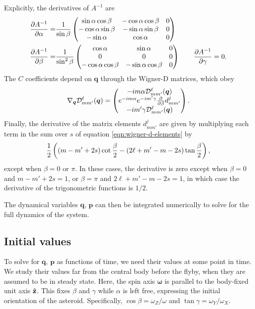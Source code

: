 \documentclass[11pt]{article}
\begin{document}
Explicitly, the derivatives of $A^{-1}$ are
\begin{equation}
\begin{aligned}
\frac{\partial A^{-1}}{\partial \alpha} = & \frac{1}{\sin \beta}\left( \begin{matrix}
\sin \alpha \cos \beta & -\cos \alpha \cos \beta & 0\\
-\cos \alpha \sin \beta & -\sin \alpha \sin \beta & 0 \\
-\sin \alpha & \cos \alpha & 0\\
\end{matrix} \right)\\
\frac{\partial A^{-1}}{\partial \beta} = & \frac{1}{\sin^2\beta}\left( \begin{matrix}
\cos \alpha & \sin \alpha & 0\\
0 & 0 & 0\\
-\cos\alpha \cos\beta & -\sin \alpha \cos \beta & 0\\
\end{matrix} \right)\qquad
\frac{\partial A^{-1}}{\partial \gamma} = 0.
\end{aligned}
\end{equation}
The $C$ coefficients depend on $\bm q$ through the Wigner-D matrices, which obey
\begin{equation}
\nabla_{\bm q}\mathcal{D}^\ell_{m m'}(\bm q) = \left( \begin{matrix}
-im\alpha \mathcal{D}^\ell_{m m'}(\bm q)\\
e^{-im\alpha} e^{-im'\gamma}\frac{\partial}{\partial \beta} d^j_{mm'}\\
-im'\gamma \mathcal{D}^\ell_{m m'}(\bm q)\\
\end{matrix} \right).
\label{eqn:wigner-d-derivatives}
\end{equation}
Finally, the derivative of the matrix elements $d^j_{mm'}$ are given by multiplying each term in the sum over $s$ of equation \ref{eqn:wigner-d-elements} by
$$\frac{1}{2}\left( (m-m'+2s) \cot \frac{\beta}{2} - (2\ell + m' - m - 2s) \tan \frac{\beta}{2} \right),$$
except when $\beta = 0$ or $\pi$. In these cases, the derivative is zero except when $\beta=0$ and $m-m'+2s=1$, or $\beta = \pi$ and $2 \ell + m' - m - 2s=1$, in which case the derivative of the trigonometric functions is $1/2$.


The dynamical variables $\bm q$, $\bm p$ can then be integrated numerically to solve for the full dynamics of the system.

\subsection{Initial values}
To solve for $\bm q$, $\bm p$ as functions of time, we need their values at some point in time. We study their values far from the central body before the flyby, when they are assumed to be in steady state. Here, the spin axis $\bm \omega$ is parallel to the body-fixed unit axis $\hat{\mathbf{z}}$. This fixes $\beta$ and $\gamma$ while $\alpha$ is left free, expressing the initial orientation of the asteroid. Specifically, $\cos\beta = \omega_Z / \omega$ and $\tan\gamma = \omega_Y/\omega_X$.
\end{document}

